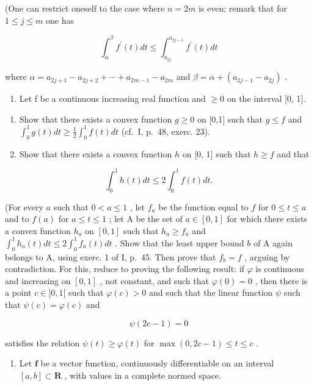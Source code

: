 (One can restrict oneself to the case where \(n = 2m\) is even; remark that for \(1 \leqslant j \leqslant m\) one has

\[
\int_ {\alpha} ^ {\beta} f ^ {\prime} (t) d t \leqslant \int_ {a _ {2 j}} ^ {a _ {2 j - 1}} f ^ {\prime} (t) d t
\]

where \(\alpha = a_{2j+1} - a_{2j+2} + \cdots + a_{2m-1} - a_{2m}\) and \(\beta = \alpha + (a_{2j-1} - a_{2j})\) .

\begin{enumerate}
\def\labelenumi{\arabic{enumi})}
\setcounter{enumi}{21}
\tightlist
\item
  Let f be a continuous increasing real function and \(\geqslant 0\) on the interval {[}0, 1{]}.
\end{enumerate}

\begin{enumerate}
\def\labelenumi{\alph{enumi})}
\item
  Show that there exists a convex function \(g \geqslant 0\) on {[}0,1{]} such that \(g \leqslant f\) and \(\int_0^1 g(t)dt \geqslant \frac{1}{2}\int_0^1 f(t)dt\) (cf.~I, p.~48, exerc. 23).
\item
  Show that there exists a convex function \(h\) on {[}0, 1{]} such that \(h \geqslant f\) and that
\end{enumerate}

\[
\int_ {0} ^ {1} h (t) d t \leqslant 2 \int_ {0} ^ {1} f (t) d t.
\]

(For every \(a\) such that \(0 < a \leqslant 1\) , let \(f_a\) be the function equal to \(f\) for \(0 \leqslant t \leqslant a\) and to \(f(a)\) for \(a \leqslant t \leqslant 1\) ; let A be the set of \(a \in [0,1]\) for which there exists a convex function \(h_a\) on \([0,1]\) such that \(h_a \geqslant f_a\) and \(\int_0^1 h_a(t)dt \leqslant 2\int_0^1 f_a(t)dt\) . Show that the least upper bound \(b\) of A again belongs to A, using exerc. 1 of I, p.~45. Then prove that \(f_{b} = f\) , arguing by contradiction. For this, reduce to proving the following result: if \(\varphi\) is continuous and increasing on \([0, 1]\) , not constant, and such that \(\varphi(0) = 0\) , then there is a point \(c \in ]0, 1[\) such that \(\varphi(c) > 0\) and such that the linear function \(\psi\) such that \(\psi(c) = \varphi(c)\) and

\[
\psi (2 c - 1) = 0
\]

satisfies the relation \(\psi(t) \geqslant \varphi(t)\) for \(\max(0, 2c - 1) \leqslant t \leqslant c\) .

\begin{enumerate}
\def\labelenumi{\arabic{enumi})}
\setcounter{enumi}{22}
\tightlist
\item
  Let \(\mathbf{f}\) be a vector function, continuously differentiable on an interval \([a, b] \subset \mathbf{R}\) , with values in a complete normed space.
\end{enumerate}

